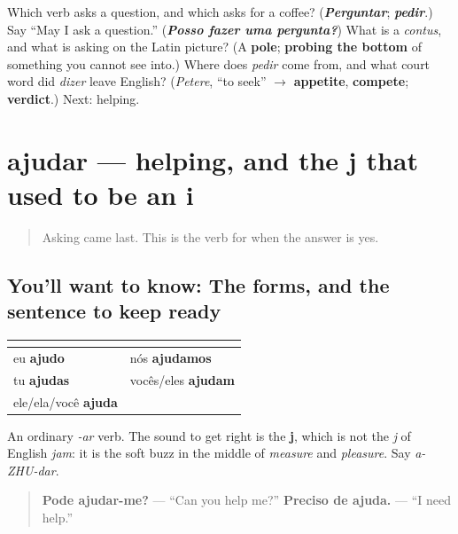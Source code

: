 \begin{tcolorbox}[breakable,colback=teal!4,colframe=teal!35!black,title={Before you move on}]
Which verb asks a question, and which asks for a coffee? (\emph{\textbf{Perguntar}}; \emph{\textbf{pedir}}.) Say \textquotedblleft{}May I ask a question.\textquotedblright{} (\emph{\textbf{Posso fazer uma pergunta?}}) What is a \emph{contus}, and what is asking on the Latin picture? (A \textbf{pole}; \textbf{probing the bottom} of something you cannot see into.) Where does \emph{pedir} come from, and what court word did \emph{dizer} leave English? (\emph{Petere}, \textquotedblleft{}to seek\textquotedblright{} $\to$ \textbf{appetite}, \textbf{compete}; \textbf{verdict}.) Next: helping.
\end{tcolorbox}
\section[ajudar]{ajudar — helping, and the j that used to be an i}

\label{lesson:PT-C20-ajudar}



\begin{quote}
Asking came last. This is the verb for when the answer is yes.
\end{quote}

\subsection*{You'll want to know: The forms, and the sentence to keep ready}
\noindent
\begin{tabularx}{\linewidth}{@{}>{\raggedright\arraybackslash}X>{\raggedright\arraybackslash}X@{}}
\toprule
\textbf{} & \textbf{} \\
\midrule
eu \textbf{ajudo} & nós \textbf{ajudamos} \\
tu \textbf{ajudas} & vocês/eles \textbf{ajudam} \\
ele/ela/você \textbf{ajuda} &  \\
\bottomrule
\end{tabularx}

An ordinary \emph{-ar} verb. The sound to get right is the \textbf{j}, which is not the \emph{j} of English \emph{jam}: it is the soft buzz in the middle of \emph{measure} and \emph{pleasure}. Say \emph{a-ZHU-dar}.

\begin{quote}
\textbf{Pode ajudar-me?} — \textquotedblleft{}Can you help me?\textquotedblright{} \textbf{Preciso de ajuda.} — \textquotedblleft{}I need help.\textquotedblright{}
\end{quote}

